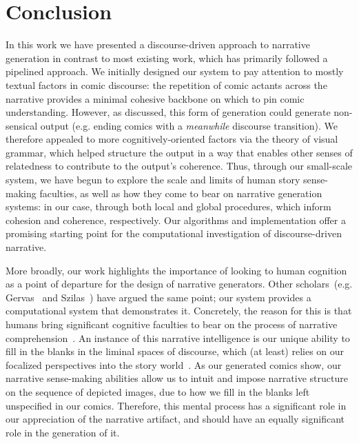 \section{Conclusion}

In this work we have presented a discourse-driven approach to narrative 
generation in contrast to most existing work, which has primarily 
followed a pipelined approach. We initially designed our system to pay 
attention to mostly textual factors in comic discourse: the repetition 
of comic actants across the narrative provides a minimal cohesive backbone 
on which to pin comic understanding.
%
However, as discussed, this form of generation could generate non-sensical
output (e.g. ending comics with a \emph{meanwhile} discourse transition). 
We therefore appealed to more cognitively-oriented factors via the theory
of visual grammar, which helped structure the output in a way that enables
other senses of relatedness to contribute to the output's coherence.
%
Thus, through our small-scale system, we have begun to explore the scale and
limits of human story sense-making faculties, as well as how they come to
bear on narrative generation systems: in our case, through both local and 
global procedures, which inform cohesion and coherence, respectively. 
%
Our algorithms and implementation offer a promising starting point for the
computational investigation of discourse-driven narrative.

More broadly, our work highlights the importance of looking to human
cognition as a point of departure for the design of narrative generators.
Other scholars~(e.g. Gervas~\cite{gervas2009computational} and
Szilas~\cite{szilas2010requirements}) have argued the same point; our
system provides a computational system that demonstrates it. Concretely,
the reason for this is that humans bring significant cognitive faculties to
bear on the process of narrative
comprehension~\cite{herman2013storytelling}.  An instance of this narrative
intelligence is our unique ability to fill in the blanks in the liminal
spaces of discourse, which (at least) relies on  our focalized perspectives
into the story world~\cite{genette1983narrative}.  As our generated comics
show, our narrative sense-making abilities allow us to intuit and impose
narrative structure on the sequence of depicted images, due to how we fill
in the blanks left unspecified in our comics. Therefore, this mental
process has a significant role in our appreciation of the narrative
artifact, and should have an equally significant role in the generation of
it.
